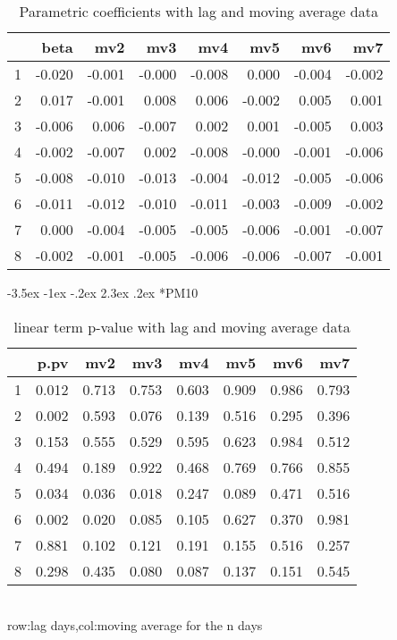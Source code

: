\documentclass[a4paper, 12pt]{article}
\makeatletter
\def\large{\fontsize{14}{20}\selectfont}
\renewcommand\subsection{\@startsection {subsection}{1}{\z@}%
                                   {-3.5ex \@plus -1ex \@minus -.2ex}%
                                   {2.3ex \@plus.2ex}%
                                   {\centering\normalfont\large\bfseries}}
\makeatother
\begin{document}
\begin{table}[h]
\centering
\caption{Parametric coefficients with lag and moving average data}
\begin{tabular}{rrrrrrrr}
  \hline
 & beta & mv2 & mv3 & mv4 & mv5 & mv6 & mv7 \\
  \hline
1 & -0.020 & -0.001 & -0.000 & -0.008 & 0.000 & -0.004 & -0.002 \\
  2 & 0.017 & -0.001 & 0.008 & 0.006 & -0.002 & 0.005 & 0.001 \\
  3 & -0.006 & 0.006 & -0.007 & 0.002 & 0.001 & -0.005 & 0.003 \\
  4 & -0.002 & -0.007 & 0.002 & -0.008 & -0.000 & -0.001 & -0.006 \\
  5 & -0.008 & -0.010 & -0.013 & -0.004 & -0.012 & -0.005 & -0.006 \\
  6 & -0.011 & -0.012 & -0.010 & -0.011 & -0.003 & -0.009 & -0.002 \\
  7 & 0.000 & -0.004 & -0.005 & -0.005 & -0.006 & -0.001 & -0.007 \\
  8 & -0.002 & -0.001 & -0.005 & -0.006 & -0.006 & -0.007 & -0.001 \\
   \hline
\end{tabular}
\end{table}
\clearpage
\subsection*{PM10}
\begin{table}[h]
\centering
\caption{linear term p-value with lag and moving average data}
\begin{tabular}{rrrrrrrr}
  \hline
 & p.pv & mv2 & mv3 & mv4 & mv5 & mv6 & mv7 \\
  \hline
1 & 0.012 & 0.713 & 0.753 & 0.603 & 0.909 & 0.986 & 0.793 \\
  2 & 0.002 & 0.593 & 0.076 & 0.139 & 0.516 & 0.295 & 0.396 \\
  3 & 0.153 & 0.555 & 0.529 & 0.595 & 0.623 & 0.984 & 0.512 \\
  4 & 0.494 & 0.189 & 0.922 & 0.468 & 0.769 & 0.766 & 0.855 \\
  5 & 0.034 & 0.036 & 0.018 & 0.247 & 0.089 & 0.471 & 0.516 \\
  6 & 0.002 & 0.020 & 0.085 & 0.105 & 0.627 & 0.370 & 0.981 \\
  7 & 0.881 & 0.102 & 0.121 & 0.191 & 0.155 & 0.516 & 0.257 \\
  8 & 0.298 & 0.435 & 0.080 & 0.087 & 0.137 & 0.151 & 0.545 \\
   \hline
\end{tabular}
\\row:lag days,col:moving average for the n days
\end{table}
\end{document}
